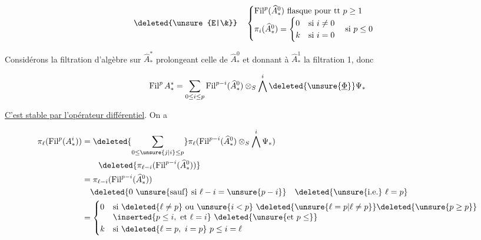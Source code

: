 

\[
\deleted{\unsure{E|\&}}\quad
\begin{cases}
 \operatorname{Fil}^p(\widehat A_*^0)\ \text{flasque pour tt }p\geq1\\
 \pi_i(\widehat A_*^0)=\begin{cases}0&\text{si }i\ne0\\ k&\text{si }i=0\end{cases}
 \quad\text{si }p\leq0
\end{cases}
\]

Considérons la filtration d'algèbre  sur $\widehat A_*^*$ prolongeant celle de $\widehat A_*^0$ et donnant  à $\widehat A_*^1$ la filtration 1, donc

\[
 \operatorname{Fil}^p A_*^{*}=\sum_{0\leq i\leq p}\operatorname{Fil}^{p-i}(\widehat A_*^0)\otimes_S\bigwedge^i\deleted{\unsure{\underline\Phi}} \Psi_*
\]

\uline{C'est stable par l'opérateur différentiel}. On a 

\[
\begin{aligned}
\pi_\ell(\operatorname{Fil}^p(A_*^i))
 &=\deleted{\sum_{0\leq\unsure{j|i}\leq p}}\pi_\ell(\operatorname{Fil}^{p-i}(\widehat A_*^0)\otimes_S\bigwedge^i\Psi_*)\\
 &\hspace{2em}\deleted{\pi_{\ell-i}(\operatorname{Fil}^{p-i}(\widehat A_*^0))}\\
 &=\pi_{\ell-i}(\operatorname{Fil}^{p-i}(\widehat A_*^0))\\
 &\quad\deleted{0\ \text{\unsure{sauf} si }\ell-i=\unsure{p-i}}\quad\deleted{\text{\unsure{i.e.} }\ell=p}\\
 &=\begin{cases}0&\text{si }\deleted{\ell\ne p}\ \text{ou }\unsure{i<p}\ \deleted{\unsure{\ell=p|\ell\ne p}}\deleted{\unsure{p\geq p}}\\[-2pt]
 &\inserted{p\leq i,\ \text{et }\ell=i}\ \deleted{\unsure{\text{et }p\leq}}\\
 k&\text{si }\deleted{\ell=p,\ i=p}\ p\leq i=\ell\end{cases}
\end{aligned}
\]

